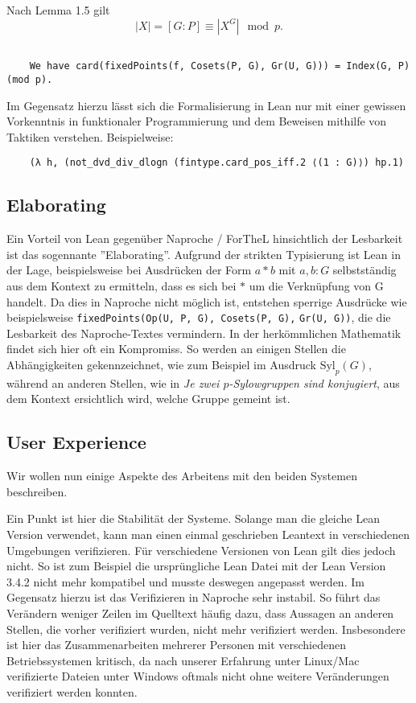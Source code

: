 \documentclass[a4paper,12pt]{scrartcl}
\begin{document}
Nach Lemma 1.5 gilt $$|X|=[G : P]\equiv |X^{G}| \mod p.$$

\begin{lstlisting}

    We have card(fixedPoints(f, Cosets(P, G), Gr(U, G))) = Index(G, P) (mod p).

\end{lstlisting}

\medskip

Im Gegensatz hierzu lässt sich die Formalisierung in Lean nur mit einer gewissen Vorkenntnis in funktionaler Programmierung und dem Beweisen mithilfe von Taktiken verstehen. Beispielweise:
\lstset{language=lean}
\begin{lstlisting}
    (λ h, (not_dvd_div_dlogn (fintype.card_pos_iff.2 ⟨(1 : G)⟩) hp.1) 
\end{lstlisting}

\subsection{Elaborating}

Ein Vorteil von Lean gegenüber Naproche / ForTheL hinsichtlich der Lesbarkeit ist das sogennante ''Elaborating''. Aufgrund der strikten Typisierung ist Lean in der Lage, beispielsweise bei Ausdrücken der Form $a * b$ mit $a, b : G$ selbstständig aus dem Kontext zu ermitteln, dass es sich bei $*$ um die Verknüpfung von G handelt. Da dies in Naproche nicht möglich ist, entstehen sperrige Ausdrücke wie beispielsweise \verb!fixedPoints(Op(U, P, G), Cosets(P, G),! \verb!Gr(U, G))!, die die Lesbarkeit des Naproche-Textes vermindern.
In der herkömmlichen Mathematik findet sich hier oft ein Kompromiss. So werden an einigen Stellen die Abhängigkeiten gekennzeichnet, wie zum Beispiel im Ausdruck $\text{Syl}_{p}(G)$, während an anderen Stellen, wie in \textit{Je zwei $p$-Sylowgruppen sind konjugiert}, aus dem Kontext ersichtlich wird, welche Gruppe gemeint ist.

\subsection{User Experience}

Wir wollen nun einige Aspekte des Arbeitens mit den beiden Systemen beschreiben.

Ein Punkt ist hier die Stabilität der Systeme. Solange man die gleiche Lean Version verwendet, kann man einen einmal geschrieben Leantext in verschiedenen Umgebungen verifizieren. Für verschiedene Versionen von Lean gilt dies jedoch nicht. So ist zum Beispiel die ursprüngliche Lean Datei \cite{bibtex.c} mit der Lean Version 3.4.2 nicht mehr kompatibel und musste deswegen angepasst werden.
Im Gegensatz hierzu ist das Verifizieren in Naproche sehr instabil. So führt das Verändern weniger Zeilen im Quelltext häufig dazu, dass Aussagen an anderen Stellen, die vorher verifiziert wurden, nicht mehr verifiziert werden. Insbesondere ist hier das Zusammenarbeiten mehrerer Personen mit verschiedenen Betriebssystemen kritisch, da nach unserer Erfahrung unter Linux/Mac verifizierte Dateien unter Windows oftmals nicht ohne weitere Veränderungen verifiziert werden konnten. 
\end{document}
